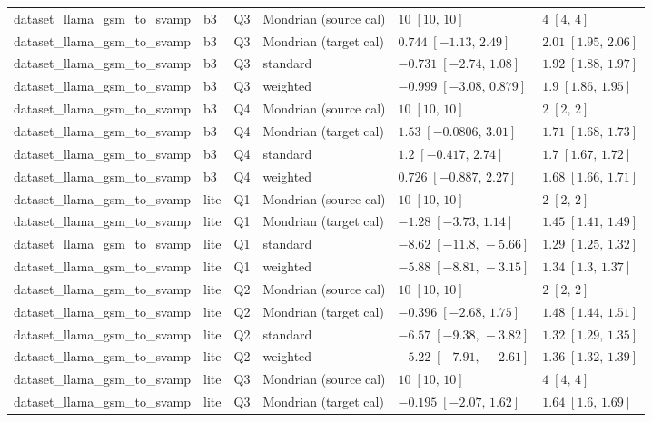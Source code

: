 \begin{longtable}{@{}p{}p{}p{}p{}p{}p{}@{}}
dataset\_llama\_gsm\_to\_svamp & b3 & Q3 & Mondrian (source cal) & $10\;[10,\,10]$ & $4\;[4,\,4]$ \\
dataset\_llama\_gsm\_to\_svamp & b3 & Q3 & Mondrian (target cal) & $0.744\;[-1.13,\,2.49]$ & $2.01\;[1.95,\,2.06]$ \\
dataset\_llama\_gsm\_to\_svamp & b3 & Q3 & standard & $-0.731\;[-2.74,\,1.08]$ & $1.92\;[1.88,\,1.97]$ \\
dataset\_llama\_gsm\_to\_svamp & b3 & Q3 & weighted & $-0.999\;[-3.08,\,0.879]$ & $1.9\;[1.86,\,1.95]$ \\
dataset\_llama\_gsm\_to\_svamp & b3 & Q4 & Mondrian (source cal) & $10\;[10,\,10]$ & $2\;[2,\,2]$ \\
dataset\_llama\_gsm\_to\_svamp & b3 & Q4 & Mondrian (target cal) & $1.53\;[-0.0806,\,3.01]$ & $1.71\;[1.68,\,1.73]$ \\
dataset\_llama\_gsm\_to\_svamp & b3 & Q4 & standard & $1.2\;[-0.417,\,2.74]$ & $1.7\;[1.67,\,1.72]$ \\
dataset\_llama\_gsm\_to\_svamp & b3 & Q4 & weighted & $0.726\;[-0.887,\,2.27]$ & $1.68\;[1.66,\,1.71]$ \\
dataset\_llama\_gsm\_to\_svamp & lite & Q1 & Mondrian (source cal) & $10\;[10,\,10]$ & $2\;[2,\,2]$ \\
dataset\_llama\_gsm\_to\_svamp & lite & Q1 & Mondrian (target cal) & $-1.28\;[-3.73,\,1.14]$ & $1.45\;[1.41,\,1.49]$ \\
dataset\_llama\_gsm\_to\_svamp & lite & Q1 & standard & $-8.62\;[-11.8,\,-5.66]$ & $1.29\;[1.25,\,1.32]$ \\
dataset\_llama\_gsm\_to\_svamp & lite & Q1 & weighted & $-5.88\;[-8.81,\,-3.15]$ & $1.34\;[1.3,\,1.37]$ \\
dataset\_llama\_gsm\_to\_svamp & lite & Q2 & Mondrian (source cal) & $10\;[10,\,10]$ & $2\;[2,\,2]$ \\
dataset\_llama\_gsm\_to\_svamp & lite & Q2 & Mondrian (target cal) & $-0.396\;[-2.68,\,1.75]$ & $1.48\;[1.44,\,1.51]$ \\
dataset\_llama\_gsm\_to\_svamp & lite & Q2 & standard & $-6.57\;[-9.38,\,-3.82]$ & $1.32\;[1.29,\,1.35]$ \\
dataset\_llama\_gsm\_to\_svamp & lite & Q2 & weighted & $-5.22\;[-7.91,\,-2.61]$ & $1.36\;[1.32,\,1.39]$ \\
dataset\_llama\_gsm\_to\_svamp & lite & Q3 & Mondrian (source cal) & $10\;[10,\,10]$ & $4\;[4,\,4]$ \\
dataset\_llama\_gsm\_to\_svamp & lite & Q3 & Mondrian (target cal) & $-0.195\;[-2.07,\,1.62]$ & $1.64\;[1.6,\,1.69]$ \\

\end{longtable}

